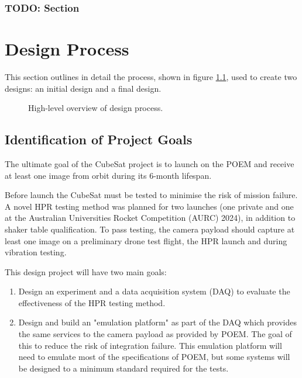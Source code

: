 \documentclass{report}
\begin{document}
\subsection{TODO: Section}




\chapter{Design Process}
\label{sec:design-process}

This section outlines in detail the process, shown in figure \ref{fig:design-process-hl}, used to create two designs: an initial design and a final design.

\begin{figure}[H]
  \centering
  
  \caption{High-level overview of design process.}
  \label{fig:design-process-hl}
\end{figure}

\section{Identification of Project Goals}
\label{sec:constraints-and-requirements}

The ultimate goal of the CubeSat project is to launch on the POEM and receive at least one image from orbit during its 6-month lifespan.

Before launch the CubeSat must be tested to minimise the risk of mission failure. A novel HPR testing method was planned for two launches (one private and one at the Australian Universities Rocket Competition (AURC) 2024), in addition to shaker table qualification. To pass testing, the camera payload should capture at least one image on a preliminary drone test flight, the HPR launch and during vibration testing.

This design project will have two main goals:

\begin{enumerate}
  \item Design an experiment and a data acquisition system (DAQ) to evaluate the effectiveness of the HPR testing method.
  \item Design and build an "emulation platform" as part of the DAQ which provides the same services to the camera payload as provided by POEM. The goal of this to reduce the risk of integration failure. This emulation platform will need to emulate most of the specifications of POEM, but some systems will be designed to a minimum standard required for the tests.
\end{enumerate}
\end{document}

